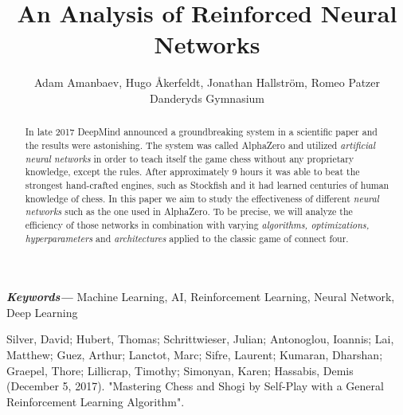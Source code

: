 \documentclass[a4paper]{article}
\title{An Analysis of Reinforced Neural Networks}
\author{Adam Amanbaev, Hugo Åkerfeldt, Jonathan Hallström, Romeo Patzer \\ 
        \small Danderyds Gymnasium \\
}
\providecommand{\keywords}[1]
{ 
    \small
    \textbf{\textit{Keywords---}} #1
}
\begin{document}
\maketitle

\begin{abstract}
    In late 2017 DeepMind announced a groundbreaking system in a scientific paper \cite{alphazero} and the results were astonishing. The system was called AlphaZero and utilized \emph{artificial neural networks} in order to teach itself the game chess without any proprietary knowledge, except the rules. After approximately 9 hours it was able to beat the strongest hand-crafted engines, such as Stockfish and it had learned centuries of human knowledge of chess. In this paper we aim to study the effectiveness of different \emph{neural networks} such as the one used in AlphaZero. To be precise, we will analyze the efficiency of those networks in combination with varying \emph{algorithms, optimizations, hyperparameters} and \emph {architectures} applied to the classic game of connect four. 
\end{abstract} \hspace{10pt}

\keywords{Machine Learning, AI, Reinforcement Learning, Neural Network, Deep Learning}

\begin{thebibliography}{100}
Silver, David; Hubert, Thomas; Schrittwieser, Julian; Antonoglou, Ioannis; Lai, Matthew; Guez, Arthur; Lanctot, Marc; Sifre, Laurent; Kumaran, Dharshan; Graepel, Thore; Lillicrap, Timothy; Simonyan, Karen; Hassabis, Demis (December 5, 2017). "Mastering Chess and Shogi by Self-Play with a General Reinforcement Learning Algorithm".

\end{thebibliography}
\end{document}

